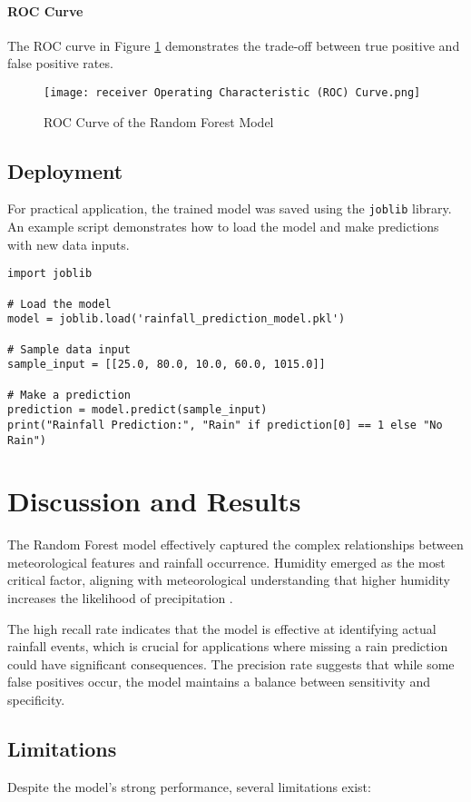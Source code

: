 \documentclass[12pt]{article}
\begin{document}
\paragraph{ROC Curve}
The ROC curve in Figure \ref{fig:roc_curve} demonstrates the trade-off between true positive and false positive rates.

\begin{figure}[H]
    \centering
    \texttt{[image: receiver Operating Characteristic (ROC) Curve.png]}
    \caption{ROC Curve of the Random Forest Model}
    \label{fig:roc_curve}
\end{figure}

\subsection{Deployment}
For practical application, the trained model was saved using the \texttt{joblib} library. An example script demonstrates how to load the model and make predictions with new data inputs.

\begin{verbatim}
import joblib

# Load the model
model = joblib.load('rainfall_prediction_model.pkl')

# Sample data input
sample_input = [[25.0, 80.0, 10.0, 60.0, 1015.0]]

# Make a prediction
prediction = model.predict(sample_input)
print("Rainfall Prediction:", "Rain" if prediction[0] == 1 else "No Rain")
\end{verbatim}

\section{Discussion and Results}
The Random Forest model effectively captured the complex relationships between meteorological features and rainfall occurrence. Humidity emerged as the most critical factor, aligning with meteorological understanding that higher humidity increases the likelihood of precipitation \cite{meteorology_textbook}.

The high recall rate indicates that the model is effective at identifying actual rainfall events, which is crucial for applications where missing a rain prediction could have significant consequences. The precision rate suggests that while some false positives occur, the model maintains a balance between sensitivity and specificity.

\subsection{Limitations}
Despite the model's strong performance, several limitations exist:
\end{document}
